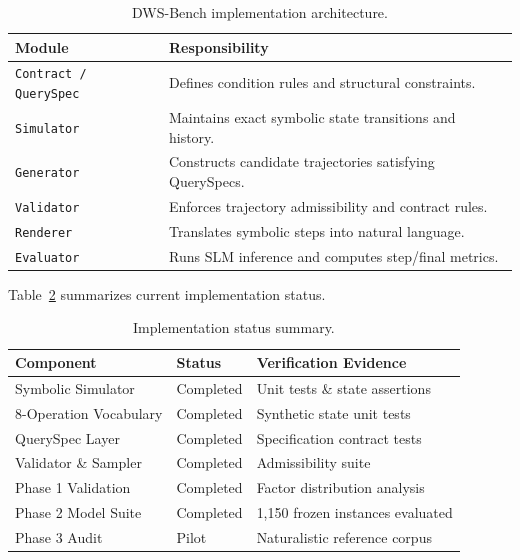 \documentclass{iutbscthesis}
\begin{document}
\begin{table}[H]
\centering
\small
\begin{tabular}{ll}
\toprule
\textbf{Module} & \textbf{Responsibility} \\
\midrule
\texttt{Contract / QuerySpec} & Defines condition rules and structural constraints. \\
\texttt{Simulator} & Maintains exact symbolic state transitions and history. \\
\texttt{Generator} & Constructs candidate trajectories satisfying QuerySpecs. \\
\texttt{Validator} & Enforces trajectory admissibility and contract rules. \\
\texttt{Renderer} & Translates symbolic steps into natural language. \\
\texttt{Evaluator} & Runs SLM inference and computes step/final metrics. \\
\bottomrule
\end{tabular}
\caption{DWS-Bench implementation architecture.}
\label{tab:implementation}
\end{table}

Table~\ref{tab:implementation-status} summarizes current implementation status.

\begin{table}[H]
\centering
\small
\begin{tabular}{lll}
\toprule
\textbf{Component} & \textbf{Status} & \textbf{Verification Evidence} \\
\midrule
Symbolic Simulator & Completed & Unit tests \& state assertions \\
8-Operation Vocabulary & Completed & Synthetic state unit tests \\
QuerySpec Layer & Completed & Specification contract tests \\
Validator \& Sampler & Completed & Admissibility suite \\
Phase 1 Validation & Completed & Factor distribution analysis \\
Phase 2 Model Suite & Completed & 1,150 frozen instances evaluated \\
Phase 3 Audit & Pilot & Naturalistic reference corpus \\
\bottomrule
\end{tabular}
\caption{Implementation status summary.}
\label{tab:implementation-status}
\end{table}

\end{document}
